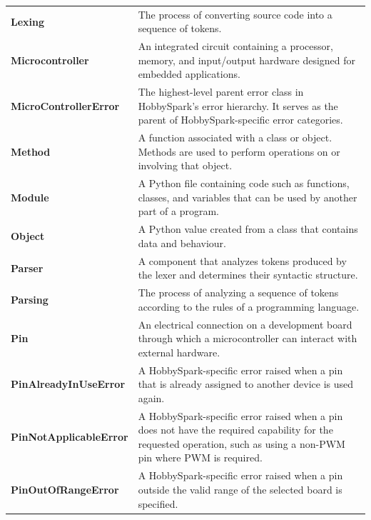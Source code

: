 \documentclass[11pt]{book}
\begin{document}
\begin{longtable}{p{} p{}}
    \textbf{Lexing} &
    The process of converting source code into a sequence of tokens. \\

    \textbf{Microcontroller} &
    An integrated circuit containing a processor, memory, and input/output hardware designed for embedded applications. \\

    \textbf{MicroControllerError} &
    The highest-level parent error class in HobbySpark's error hierarchy. It serves as the parent of HobbySpark-specific error categories. \\

    \textbf{Method} &
    A function associated with a class or object. Methods are used to perform operations on or involving that object. \\

    \textbf{Module} &
    A Python file containing code such as functions, classes, and variables that can be used by another part of a program. \\

    \textbf{Object} &
    A Python value created from a class that contains data and behaviour. \\

    \textbf{Parser} &
    A component that analyzes tokens produced by the lexer and determines their syntactic structure. \\

    \textbf{Parsing} &
    The process of analyzing a sequence of tokens according to the rules of a programming language. \\

    \textbf{Pin} &
    An electrical connection on a development board through which a microcontroller can interact with external hardware. \\

    \textbf{PinAlreadyInUseError} &
    A HobbySpark-specific error raised when a pin that is already assigned to another device is used again. \\

    \textbf{PinNotApplicableError} &
    A HobbySpark-specific error raised when a pin does not have the required capability for the requested operation, such as using a non-PWM pin where PWM is required. \\

    \textbf{PinOutOfRangeError} &
    A HobbySpark-specific error raised when a pin outside the valid range of the selected board is specified. \\


\end{longtable}
\end{document}
